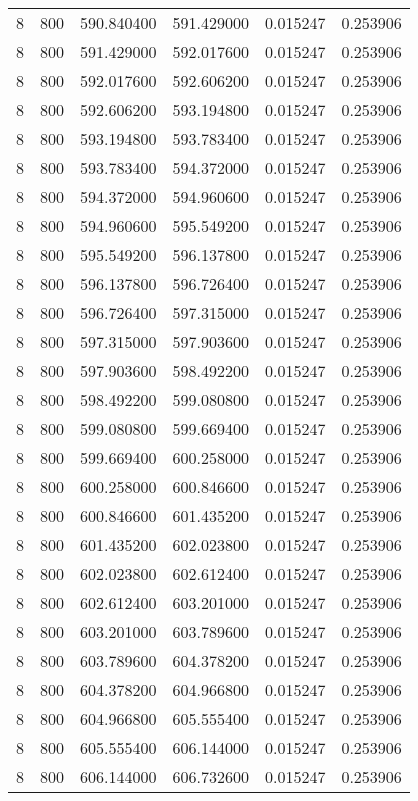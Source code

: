 \begin{longtable}{rrrrrr}
8 & 800 & 590.840400 & 591.429000 & 0.015247 & 0.253906 \\
8 & 800 & 591.429000 & 592.017600 & 0.015247 & 0.253906 \\
8 & 800 & 592.017600 & 592.606200 & 0.015247 & 0.253906 \\
8 & 800 & 592.606200 & 593.194800 & 0.015247 & 0.253906 \\
8 & 800 & 593.194800 & 593.783400 & 0.015247 & 0.253906 \\
8 & 800 & 593.783400 & 594.372000 & 0.015247 & 0.253906 \\
8 & 800 & 594.372000 & 594.960600 & 0.015247 & 0.253906 \\
8 & 800 & 594.960600 & 595.549200 & 0.015247 & 0.253906 \\
8 & 800 & 595.549200 & 596.137800 & 0.015247 & 0.253906 \\
8 & 800 & 596.137800 & 596.726400 & 0.015247 & 0.253906 \\
8 & 800 & 596.726400 & 597.315000 & 0.015247 & 0.253906 \\
8 & 800 & 597.315000 & 597.903600 & 0.015247 & 0.253906 \\
8 & 800 & 597.903600 & 598.492200 & 0.015247 & 0.253906 \\
8 & 800 & 598.492200 & 599.080800 & 0.015247 & 0.253906 \\
8 & 800 & 599.080800 & 599.669400 & 0.015247 & 0.253906 \\
8 & 800 & 599.669400 & 600.258000 & 0.015247 & 0.253906 \\
8 & 800 & 600.258000 & 600.846600 & 0.015247 & 0.253906 \\
8 & 800 & 600.846600 & 601.435200 & 0.015247 & 0.253906 \\
8 & 800 & 601.435200 & 602.023800 & 0.015247 & 0.253906 \\
8 & 800 & 602.023800 & 602.612400 & 0.015247 & 0.253906 \\
8 & 800 & 602.612400 & 603.201000 & 0.015247 & 0.253906 \\
8 & 800 & 603.201000 & 603.789600 & 0.015247 & 0.253906 \\
8 & 800 & 603.789600 & 604.378200 & 0.015247 & 0.253906 \\
8 & 800 & 604.378200 & 604.966800 & 0.015247 & 0.253906 \\
8 & 800 & 604.966800 & 605.555400 & 0.015247 & 0.253906 \\
8 & 800 & 605.555400 & 606.144000 & 0.015247 & 0.253906 \\
8 & 800 & 606.144000 & 606.732600 & 0.015247 & 0.253906 \\

\end{longtable}
